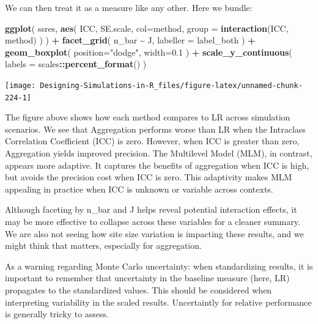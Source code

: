 \documentclass[
]{book}
\newenvironment{Shaded}{\begin{snugshade}}{\end{snugshade}}
\newcommand{\AttributeTok}[1]{\textcolor[rgb]{0.13,0.29,0.53}{#1}}
\newcommand{\FloatTok}[1]{\textcolor[rgb]{0.00,0.00,0.81}{#1}}
\newcommand{\FunctionTok}[1]{\textcolor[rgb]{0.13,0.29,0.53}{\textbf{#1}}}
\newcommand{\NormalTok}[1]{#1}
\newcommand{\SpecialCharTok}[1]{\textcolor[rgb]{0.81,0.36,0.00}{\textbf{#1}}}
\newcommand{\StringTok}[1]{\textcolor[rgb]{0.31,0.60,0.02}{#1}}
\begin{document}
We can then treat it as a measure like any other.
Here we bundle:

\begin{Shaded}
\begin{Highlighting}[]
\FunctionTok{ggplot}\NormalTok{( ssres, }\FunctionTok{aes}\NormalTok{( ICC, SE.scale, }\AttributeTok{col=}\NormalTok{method,}
                    \AttributeTok{group =} \FunctionTok{interaction}\NormalTok{(ICC, method) ) ) }\SpecialCharTok{+}
  \FunctionTok{facet\_grid}\NormalTok{( n\_bar }\SpecialCharTok{\textasciitilde{}}\NormalTok{  J, }\AttributeTok{labeller =}\NormalTok{ label\_both ) }\SpecialCharTok{+}
  \FunctionTok{geom\_boxplot}\NormalTok{( }\AttributeTok{position=}\StringTok{"dodge"}\NormalTok{, }\AttributeTok{width=}\FloatTok{0.1}\NormalTok{ ) }\SpecialCharTok{+}
  \FunctionTok{scale\_y\_continuous}\NormalTok{( }\AttributeTok{labels =}\NormalTok{ scales}\SpecialCharTok{::}\FunctionTok{percent\_format}\NormalTok{() )}
\end{Highlighting}
\end{Shaded}

\begin{center}\texttt{[image: Designing-Simulations-in-R\_files/figure-latex/unnamed-chunk-224-1]} \end{center}

The figure above shows how each method compares to LR across simulation scenarios. We see that Aggregation performs worse than LR when the Intraclass Correlation Coefficient (ICC) is zero. However, when ICC is greater than zero, Aggregation yields improved precision.
The Multilevel Model (MLM), in contrast, appears more adaptive. It captures the benefits of aggregation when ICC is high, but avoids the precision cost when ICC is zero. This adaptivity makes MLM appealing in practice when ICC is unknown or variable across contexts.

Although faceting by n\_bar and J helps reveal potential interaction effects, it may be more effective to collapse across these variables for a cleaner summary.
We are also not seeing how site size variation is impacting these results, and we might think that matters, especially for aggregation.

As a warning regarding Monte Carlo uncertainty: when standardizing results, it is important to remember that uncertainty in the baseline measure (here, LR) propagates to the standardized values. This should be considered when interpreting variability in the scaled results.
Uncertaintly for relative performance is generally tricky to assess.
\end{document}
